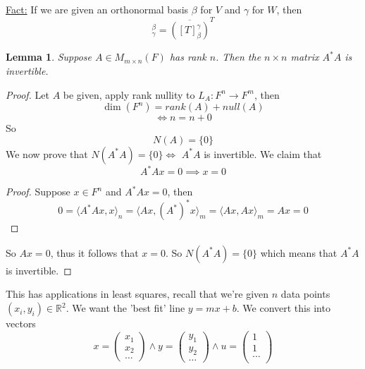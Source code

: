 \documentclass{article}
\newtheorem{lemma}[theorem]{Lemma}
\newtheorem{one minute paper}[theorem]{One Minute Paper}
\begin{document}
\underline{Fact:} If we are given an orthonormal basis $\beta$ for $V$ and $\gamma$ for $W$, then 
\begin{equation}
    [T^*]_\gamma^\beta = \overline{\left([T]_\beta^\gamma\right)}^T
\end{equation}

\begin{lemma}
    Suppose $A \in M_{m\times n}(F)$ has rank $n$. Then the $n \times n$ matrix $A^* A$ is invertible. 
\end{lemma}

\begin{proof}
    Let $A$ be given, apply rank nullity to $L_A : F^n \rightarrow F^m$, then 
    \begin{equation}
        \dim(F^n) = rank(A) + null(A)
    \end{equation}
    \begin{equation}
        \iff n = n + 0
    \end{equation}
    So 
    \begin{equation}
        N(A) = \{0\}
    \end{equation}
    We now prove that $N(A^* A) = \{0\} \iff $ $A^* A$ is invertible. We claim that 
    \begin{equation}
        A^* A x = 0 \implies x = 0
    \end{equation}
    \begin{proof}
        Suppose $x \in F^n$ and $A^* A x = 0$, then
        \begin{equation}
            0 = \langle A^* Ax, x \rangle_n = \langle Ax, (A^*)^* x \rangle_m = \langle Ax, Ax \rangle_m = Ax = 0
        \end{equation}
    \end{proof}
    So $Ax = 0$, thus it follows that $x = 0$. So $N(A^* A) = \{0\}$ which means that $A^* A$ is invertible. 
\end{proof}

This has applications in least squares, recall that we're given $n$ data points $(x_i, y_i) \in \mathbb{R}^2$. We want the 'best fit' line $y = mx + b$. We convert this into 
vectors 
\begin{equation}
    x = \begin{pmatrix}
        x_1 \\
        x_2 \\
        \dots
    \end{pmatrix} \land y = \begin{pmatrix}
        y_1 \\
        y_2 \\
        \dots
    \end{pmatrix} \land u = \begin{pmatrix}
        1 \\
        1 \\
        \dots \\
    \end{pmatrix}
\end{equation}
\end{document}

